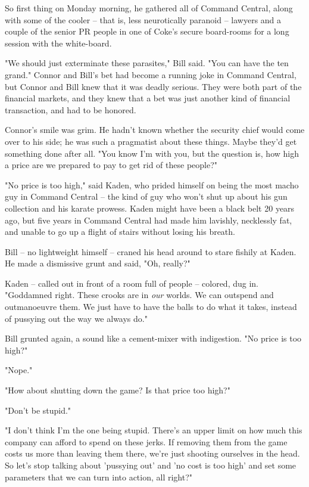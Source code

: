 So first thing on Monday morning, he gathered all of Command
Central, along with some of the cooler -- that is, less
neurotically paranoid -- lawyers and a couple of the senior PR
people in one of Coke's secure board-rooms for a long session with
the white-board.

"We should just exterminate these parasites," Bill said. "You can
have the ten grand." Connor and Bill's bet had become a running
joke in Command Central, but Connor and Bill knew that it was
deadly serious. They were both part of the financial markets, and
they knew that a bet was just another kind of financial
transaction, and had to be honored.

Connor's smile was grim. He hadn't known whether the security chief
would come over to his side; he was such a pragmatist about these
things. Maybe they'd get something done after all. "You know I'm
with you, but the question is, how high a price are we prepared to
pay to get rid of these people?"

"No price is too high," said Kaden, who prided himself on being the
most macho guy in Command Central -- the kind of guy who won't shut
up about his gun collection and his karate prowess. Kaden might
have been a black belt 20 years ago, but five years in Command
Central had made him lavishly, necklessly fat, and unable to go up
a flight of stairs without losing his breath.

Bill -- no lightweight himself -- craned his head around to stare
fishily at Kaden. He made a dismissive grunt and said, "Oh,
really?"

Kaden -- called out in front of a room full of people -- colored,
dug in. "Goddamned right. These crooks are in \emph{our} worlds. We
can outspend and outmanoeuvre them. We just have to have the balls
to do what it takes, instead of pussying out the way we always
do."

Bill grunted again, a sound like a cement-mixer with indigestion.
"No price is too high?"

"Nope."

"How about shutting down the game? Is that price too high?"

"Don't be stupid."

"I don't think I'm the one being stupid. There's an upper limit on
how much this company can afford to spend on these jerks. If
removing them from the game costs us more than leaving them there,
we're just shooting ourselves in the head. So let's stop talking
about 'pussying out' and 'no cost is too high' and set some
parameters that we can turn into action, all right?"

